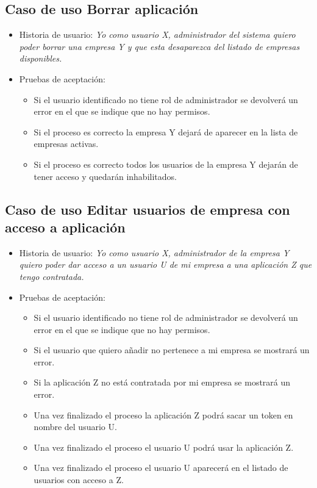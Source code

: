 \documentclass[12pt,a4paperpaper,]{report}
\providecommand{\tightlist}{%
  \setlength{\itemsep}{0pt}\setlength{\parskip}{0pt}}
\begin{document}
\subsection{Caso de uso Borrar
aplicación}\label{caso-de-uso-borrar-aplicaciuxf3n-2}

\begin{itemize}
\tightlist
\item
  Historia de usuario: \emph{Yo como usuario X, administrador del
  sistema quiero poder borrar una empresa Y y que esta desaparezca del
  listado de empresas disponibles.}
\item
  Pruebas de aceptación:

  \begin{itemize}
  \tightlist
  \item
    Si el usuario identificado no tiene rol de administrador se
    devolverá un error en el que se indique que no hay permisos.
  \item
    Si el proceso es correcto la empresa Y dejará de aparecer en la
    lista de empresas activas.
  \item
    Si el proceso es correcto todos los usuarios de la empresa Y dejarán
    de tener acceso y quedarán inhabilitados.
  \end{itemize}
\end{itemize}

\subsection{Caso de uso Editar usuarios de empresa con acceso a
aplicación}\label{caso-de-uso-editar-usuarios-de-empresa-con-acceso-a-aplicaciuxf3n-1}

\begin{itemize}
\tightlist
\item
  Historia de usuario: \emph{Yo como usuario X, administrador de la
  empresa Y quiero poder dar acceso a un usuario U de mi empresa a una
  aplicación Z que tengo contratada.}
\item
  Pruebas de aceptación:

  \begin{itemize}
  \tightlist
  \item
    Si el usuario identificado no tiene rol de administrador se
    devolverá un error en el que se indique que no hay permisos.
  \item
    Si el usuario que quiero añadir no pertenece a mi empresa se
    mostrará un error.
  \item
    Si la aplicación Z no está contratada por mi empresa se mostrará un
    error.
  \item
    Una vez finalizado el proceso la aplicación Z podrá sacar un token
    en nombre del usuario U.
  \item
    Una vez finalizado el proceso el usuario U podrá usar la aplicación
    Z.
  \item
    Una vez finalizado el proceso el usuario U aparecerá en el listado
    de usuarios con acceso a Z.
  \end{itemize}
\end{itemize}
\end{document}
